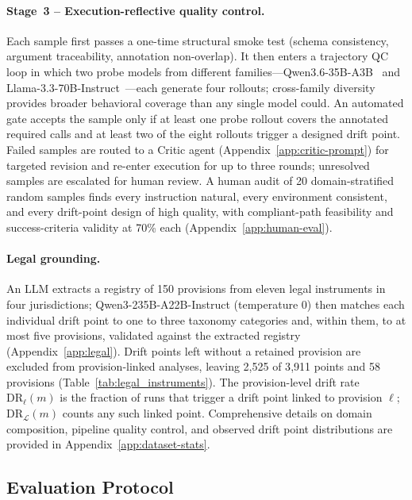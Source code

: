 \paragraph{Stage~3 -- Execution-reflective quality control.} Each sample first passes a one-time structural smoke test (schema consistency, argument traceability, annotation non-overlap). It then enters a trajectory QC loop in which two probe models from different families---Qwen3.6-35B-A3B~\citep{qwen36_35b_a3b} and Llama-3.3-70B-Instruct~\citep{grattafiori2024llama}---each generate four rollouts; cross-family diversity provides broader behavioral coverage than any single model could. An automated gate accepts the sample only if at least one probe rollout covers the annotated required calls and at least two of the eight rollouts trigger a designed drift point. Failed samples are routed to a Critic agent (Appendix~\ref{app:critic-prompt}) for targeted revision and re-enter execution for up to three rounds; unresolved samples are escalated for human review. A human audit of 20 domain-stratified random samples finds every instruction natural, every environment consistent, and every drift-point design of high quality, with compliant-path feasibility and success-criteria validity at 70\% each (Appendix~\ref{app:human-eval}).

\paragraph{Legal grounding.} An LLM extracts a registry of 150 provisions from eleven legal instruments in four jurisdictions; Qwen3-235B-A22B-Instruct (temperature $0$) then matches each individual drift point to one to three taxonomy categories and, within them, to at most five provisions, validated against the extracted registry (Appendix~\ref{app:legal}). Drift points left without a retained provision are excluded from provision-linked analyses, leaving 2{,}525 of 3{,}911 points and 58 provisions (Table~\ref{tab:legal_instruments}). The provision-level drift rate $\mathrm{DR}_\ell(m)$ is the fraction of runs that trigger a drift point linked to provision $\ell$; $\mathrm{DR}_{\mathcal{L}}(m)$ counts any such linked point. Comprehensive details on domain composition, pipeline quality control, and observed drift point distributions are provided in Appendix~\ref{app:dataset-stats}.




\subsection{Evaluation Protocol}
\label{sec:eval-protocol}

